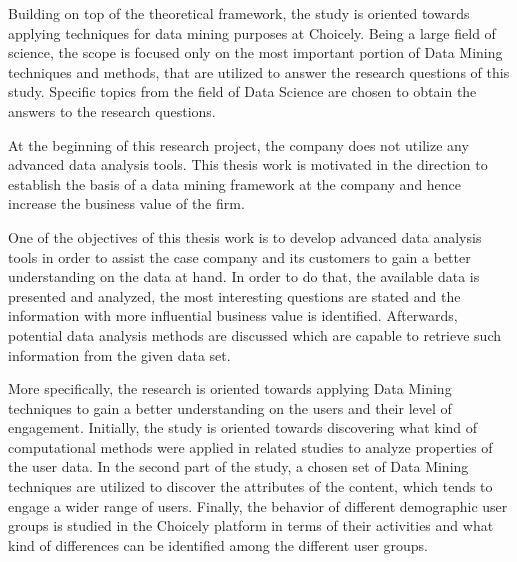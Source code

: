     Building on top of the theoretical framework, the study is oriented towards applying techniques for data mining purposes at Choicely. Being a large field of science, the scope is focused only on the most important portion of Data Mining techniques and methods, that are utilized to answer the research questions of this study. Specific topics from the field of Data Science are chosen to obtain the answers to the research questions. 
    
    At the beginning of this research project, the company does not utilize any advanced data analysis tools. This thesis work is motivated in the direction to establish the basis of a data mining framework at the company and hence increase the business value of the firm.  

    One of the objectives of this thesis work is to develop advanced data analysis tools in order to assist the case company and its customers to gain a better understanding on the data at hand. In order to do that, the available data is presented and analyzed, the most interesting questions are stated and the information with more influential business value is identified. Afterwards, potential data analysis methods are discussed which are capable to retrieve such information from the given data set.  

    More specifically, the research is oriented towards applying Data Mining techniques to gain a better understanding on the users and their level of engagement. Initially, the study is oriented towards discovering what kind of computational methods were applied in related studies to analyze properties of the user data. In the second part of the study, a chosen set of Data Mining techniques are utilized to discover the attributes of the content, which tends to engage a wider range of users. Finally, the behavior of different demographic user groups is studied in the Choicely platform in terms of their activities and what kind of differences can be identified among the different user groups.

